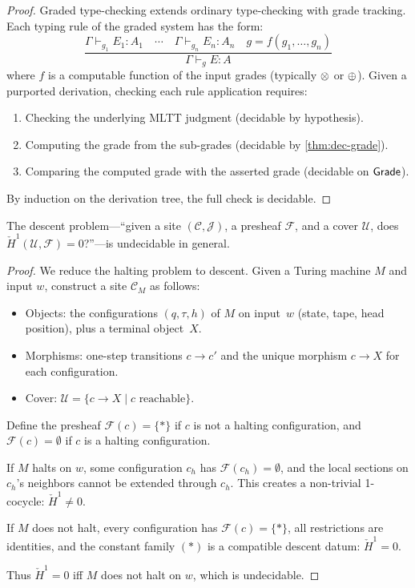 \begin{proof}
Graded type-checking extends ordinary type-checking with grade
tracking.  Each typing rule of the graded system has the form:
\[
  \dfrac{\Gamma \vdash_{g_1} E_1 : A_1 \quad \cdots \quad
    \Gamma \vdash_{g_n} E_n : A_n \quad g = f(g_1, \ldots, g_n)}
    {\Gamma \vdash_g E : A}
\]
where $f$ is a computable function of the input grades (typically
$\otimes$ or $\oplus$).  Given a purported derivation, checking each rule
application requires:
\begin{enumerate}[label=(\arabic*),nosep]
\item Checking the underlying MLTT judgment (decidable by hypothesis).
\item Computing the grade from the sub-grades (decidable by
  \cref{thm:dec-grade}).
\item Comparing the computed grade with the asserted grade (decidable
  on $\mathsf{Grade}$).
\end{enumerate}
By induction on the derivation tree, the full check is decidable.
\end{proof}

\begin{theorem}
\label{thm:undec-descent}
The descent problem---``given a site $(\mathcal{C}, \mathcal{J})$, a
presheaf $\mathcal{F}$, and a cover $\mathcal{U}$, does
$\check{H}^1(\mathcal{U}, \mathcal{F}) = 0$?''---is undecidable in
general.
\end{theorem}

\begin{proof}
We reduce the halting problem to descent.  Given a Turing machine $M$
and input $w$, construct a site $\mathcal{C}_M$ as follows:
\begin{itemize}[nosep]
\item Objects: the configurations $(q, \tau, h)$ of $M$ on input~$w$
  (state, tape, head position), plus a terminal object~$X$.
\item Morphisms: one-step transitions $c \to c'$ and the unique
  morphism $c \to X$ for each configuration.
\item Cover: $\mathcal{U} = \{c \to X \mid c \text{ reachable}\}$.
\end{itemize}
Define the presheaf $\mathcal{F}(c) = \{*\}$ if $c$ is not a
halting configuration, and $\mathcal{F}(c) = \emptyset$ if $c$ is a
halting configuration.

If $M$ halts on $w$, some configuration $c_h$ has
$\mathcal{F}(c_h) = \emptyset$, and the local sections on
$c_h$'s neighbors cannot be extended through $c_h$.  This creates a
non-trivial 1-cocycle: $\check{H}^1 \neq 0$.

If $M$ does not halt, every configuration has
$\mathcal{F}(c) = \{*\}$, all restrictions are identities, and the
constant family $(*)$ is a compatible descent datum:
$\check{H}^1 = 0$.

Thus $\check{H}^1 = 0$ iff $M$ does not halt on $w$, which is
undecidable.
\end{proof}

